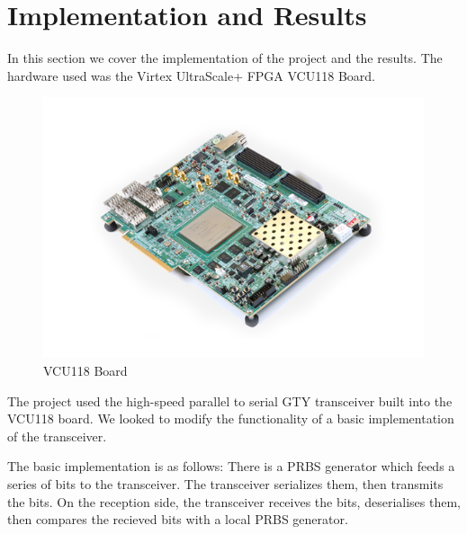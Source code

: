 \chapter{Implementation and Results}
In this section we cover the implementation of the project and the results.
The hardware used was the Virtex UltraScale+ FPGA VCU118 Board.
\begin{figure}[ht]
    \centering
    \includegraphics[width=0.8\linewidth]{img/board.jpg}
    \caption{VCU118 Board}%
    \label{fig:board}
\end{figure}

The project used the high-speed parallel to serial GTY transceiver built into
the VCU118 board. We looked to modify the functionality of a basic
implementation of the  transceiver.

The basic implementation is as follows:
There is a PRBS generator which feeds a series of bits to the transceiver. The
transceiver serializes them, then transmits the bits. 
On the reception side, the transceiver receives the bits, deserialises them,
then compares the recieved bits with a local PRBS generator.

